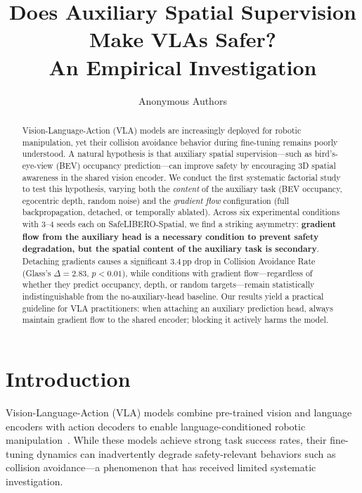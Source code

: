 \documentclass[letterpaper]{article}
\title{Does Auxiliary Spatial Supervision Make VLAs Safer?\\ An Empirical Investigation}
\author{
  Anonymous Authors
}
\date{}
\newcommand{\pp}{\,\textrm{pp}}
\begin{document}
\maketitle

\begin{abstract}
Vision-Language-Action (VLA) models are increasingly deployed for robotic manipulation, yet their collision avoidance behavior during fine-tuning remains poorly understood.
A natural hypothesis is that auxiliary spatial supervision---such as bird's-eye-view (BEV) occupancy prediction---can improve safety by encouraging 3D spatial awareness in the shared vision encoder.
We conduct the first systematic factorial study to test this hypothesis, varying both the \emph{content} of the auxiliary task (BEV occupancy, egocentric depth, random noise) and the \emph{gradient flow} configuration (full backpropagation, detached, or temporally ablated).
Across six experimental conditions with 3--4 seeds each on SafeLIBERO-Spatial, we find a striking asymmetry: \textbf{gradient flow from the auxiliary head is a necessary condition to prevent safety degradation, but the spatial content of the auxiliary task is secondary}.
Detaching gradients causes a significant 3.4\pp{} drop in Collision Avoidance Rate (Glass's $\Delta=2.83$, $p<0.01$), while conditions with gradient flow---regardless of whether they predict occupancy, depth, or random targets---remain statistically indistinguishable from the no-auxiliary-head baseline.
Our results yield a practical guideline for VLA practitioners: when attaching an auxiliary prediction head, always maintain gradient flow to the shared encoder; blocking it actively harms the model.
\end{abstract}

\section{Introduction}
\label{sec:intro}

Vision-Language-Action (VLA) models combine pre-trained vision and language encoders with action decoders to enable language-conditioned robotic manipulation~\citep{brohan2023rt2,kim2024openvla,team2024octo}.
While these models achieve strong task success rates, their fine-tuning dynamics can inadvertently degrade safety-relevant behaviors such as collision avoidance---a phenomenon that has received limited systematic investigation.
\end{document}
